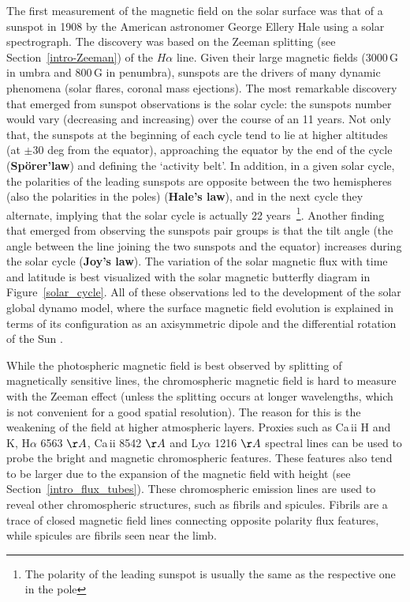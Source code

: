 \documentclass[goettingen, gauss, print]{thesis}
\begin{document}
The first measurement of the magnetic field on the solar surface was that of a sunspot in 1908 by the American astronomer George Ellery Hale using a solar spectrograph. The discovery was based on the Zeeman splitting (see Section~\ref{intro-Zeeman}) of the $H\alpha$ line. Given their large magnetic fields (3000\,G in umbra and 800\,G in penumbra), sunspots are the drivers of many dynamic phenomena (solar flares, coronal mass ejections). The most remarkable discovery that emerged from sunspot observations is the solar cycle: the sunspots number would vary (decreasing and increasing) over the course of an 11 years. Not only that, the sunspots at the beginning of each cycle tend to lie at higher altitudes (at $\pm$30 deg from the equator), approaching the equator by the end of the cycle (\textbf{Sp\"{o}rer'law}) and defining the `activity belt'. In addition, in a given solar cycle, the polarities of the leading sunspots are opposite between the two hemispheres (also the polarities in the poles) (\textbf{Hale's law}), and in the next cycle they alternate, implying that the solar cycle is actually 22 years~\footnote{The polarity of the leading sunspot is usually the same as the respective one in the pole}. Another finding that emerged from observing the sunspots pair groups is that the tilt angle (the angle between the line joining the two sunspots and the equator) increases during the solar cycle (\textbf{Joy's law}). The variation of the solar magnetic flux with time and latitude is best visualized with the solar magnetic butterfly diagram in Figure~\ref{solar_cycle}. All of these observations led to the development of the solar global dynamo model, where the surface magnetic field evolution is explained in terms of its configuration as an axisymmetric dipole and the differential rotation of the Sun \citep{babcock_topology_1961}. 


While the photospheric magnetic field is best observed by splitting of magnetically sensitive lines, the chromospheric magnetic field is hard to measure with the Zeeman effect (unless the splitting occurs at longer wavelengths, which is not convenient for a good spatial resolution). The reason for this is the weakening of the field at higher atmospheric layers. Proxies such as Ca\,{\sc ii} H and K, H$\alpha$ 6563 $\AA$, Ca\,{\sc ii} 8542 $\AA$ and Ly$\alpha$ 1216 $\AA$ spectral lines can be used to probe the bright and magnetic chromospheric features. These features also tend to be larger due to the expansion of the magnetic field with height (see Section~\ref{intro_flux_tubes}). These chromospheric emission lines are used to reveal other chromospheric structures, such as fibrils and spicules. Fibrils are a trace of closed magnetic field lines connecting opposite polarity flux features, while spicules are fibrils seen near the limb.
\end{document}
